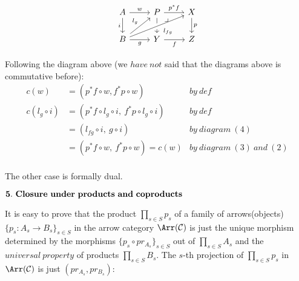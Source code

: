 \begin{prf}
            \[\begin{tikzcd}
                A & P & X \\
                B & Y & Z
                \arrow["{l_{g}}", from=2-1, to=1-2]
                \arrow["{i }"', from=1-1, to=2-1]
                \arrow["w", from=1-1, to=1-2]
                \arrow[from=1-2, to=2-2]
                \arrow["{p^*f}", from=1-2, to=1-3]
                \arrow["p", from=1-3, to=2-3]
                \arrow["f"', from=2-2, to=2-3]
                \arrow["g"', from=2-1, to=2-2]
                \arrow["{\ \ \! l_{fg}}"', from=2-1, to=1-3, crossing over]
                \arrow["{\big \lrcorner}"{anchor=center, pos=0.125}, draw=none, from=1-2, to=2-3]
            \end{tikzcd}\]

            \par Following the diagram above (we $have\ not$ said that the diagrams above is commutative before):
            \begin{align*}
                c(w) &= (p^*f \circ w, f^*p \circ w) & by\ def\\
                c(l_g \circ i) &= (p^*f \circ l_g \circ i,\ f^*p \circ l_g \circ i) & by\ def\\
                &= (l_{fg} \circ i,\ g \circ i)  & by\ diagram\ (4)\\
                &= (p^*f \circ w,\ f^*p \circ w) = c(w) & by\ diagram\ (3)\ and\ (2)\\
            \end{align*}

            \par The other case is formally dual.\\

        \par $\mbf{5.\ Closure\ under\ products\ and\ coproducts}$\\

            \par It is easy to prove that the product $\prod\limits_{s \in S} p_s$ of
            a family of arrows(objects) $\{p_s : A_s \to B_s\}_{s \in S}$ in the arrow category
            $\Arr(\mcC)$ is just the unique morphism determined by
            the morphisms $\{ p_s \circ pr_{A_s} \}_{s \in S}$ out of $\prod\limits_{s \in S} A_s$
            and the  $universal\ property$ of products $\prod\limits_{s \in S} B_s$.
            The $s$-th projection of $\prod\limits_{s \in S} p_s$ in $\Arr(\mcC)$ is just $(pr_{A_s}, pr_{B_s})$:


\end{prf}
